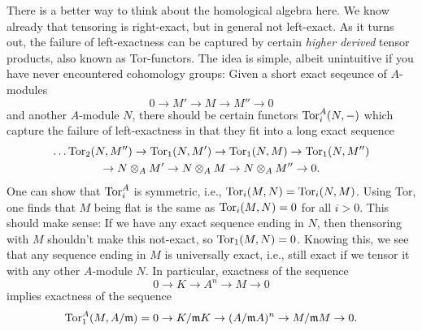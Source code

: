 \documentclass[a4paper,11pt]{article}
\begin{document}
There is a better way to think about the homological algebra here. We know
already that tensoring is right-exact, but in general not left-exact. As it
turns out, the failure of left-exactness can be captured by certain
\textit{higher derived} tensor products, also known as Tor-functors. The idea
is simple, albeit unintuitive if you have never encountered cohomology groups:
Given a short exact seqeunce of $A$-modules
\begin{equation*}
    0 \to M' \to M \to M'' \to 0
\end{equation*}
and another $A$-module $N$, there should be certain functors $\operatorname{Tor}_i^A(N,-)$
which capture the failure of left-exactness in that they fit into a long exact
sequence
\begin{multline*}
    \dots \operatorname{Tor}_2(N, M'') \to \operatorname{Tor}_1(N,M') \to \operatorname{Tor}_1(N,M) \to \operatorname{Tor}_1(N,M'') \\ 
    \to N \otimes_A M' \to N \otimes_A M \to N \otimes_A M'' \to 0.
\end{multline*}
One can show that $\operatorname{Tor}_i^A$ is symmetric, i.e., $\operatorname{Tor}_i(M,N) = \operatorname{Tor}_i(N,M)$. 
Using Tor, one finds that $M$ being flat is the same as $\operatorname{Tor}_i(M, N) = 0$
for all $i > 0$. This should make sense: If we have any exact sequence 
ending in $N$, then thensoring with $M$ shouldn't make this not-exact, so 
$\operatorname{Tor}_1(M,N) = 0$. Knowing this, we see that any sequence ending in $M$ is
universally exact, i.e., still exact if we tensor it with any other $A$-module 
$N$. In particular, exactness of the sequence
\begin{equation*}
    0 \to K \to A^n \to M \to 0
\end{equation*}
implies exactness of the sequence
\begin{equation*}
    \operatorname{Tor}_1^A(M, A/\mathfrak{m}) = 0 \to K/ \mathfrak{m} K \to (A/\mathfrak{m} A)^n \to M/\mathfrak{m} M \to 0.
\end{equation*}



\contactend
\end{document}
